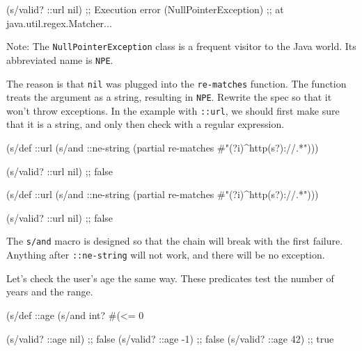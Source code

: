 \begin{english}
  \begin{clojure}
(s/valid? ::url nil)
;; Execution error (NullPointerException)
;; at java.util.regex.Matcher...
  \end{clojure}
\end{english}


Note: The  \verb|NullPointerException| class is a frequent visitor to the Java world. Its abbreviated name is \verb|NPE|.

The reason is that \verb|nil| was plugged into the \verb|re-matches| function. The function treats the argument as a string, resulting in \verb|NPE|. Rewrite the spec so that it won't throw exceptions. In the example with \verb|::url|, we should first make sure that it is a string, and only then check with a regular expression.

\ifx\DEVICETYPE\MOBILE

\begin{english}
  \begin{clojure}
(s/def ::url
  (s/and ::ne-string
         (partial re-matches
           #"(?i)^http(s?)://.*")))

(s/valid? ::url nil) ;; false
  \end{clojure}
\end{english}

\else

\begin{english}
  \begin{clojure}
(s/def ::url
  (s/and ::ne-string
         (partial re-matches #"(?i)^http(s?)://.*")))

(s/valid? ::url nil) ;; false
  \end{clojure}
\end{english}

\fi


The \verb|s/and| macro is designed so that the chain will break with the first failure. Anything after \verb|::ne-string| will not work, and there will be no exception.

Let's check the user's age the same way. These predicates test the number of years and the range.

\begin{english}
  \begin{clojure}
(s/def ::age
  (s/and int? #(<= 0 %

(s/valid? ::age nil) ;; false
(s/valid? ::age -1)  ;; false
(s/valid? ::age 42)  ;; true
  \end{clojure}
\end{english}

